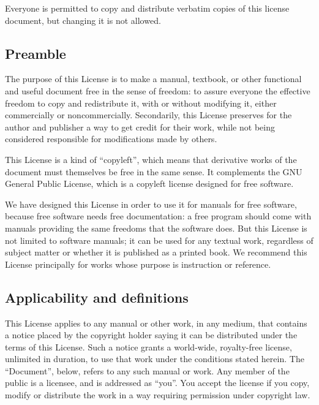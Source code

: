 {\tiny{}Everyone is permitted to copy and distribute verbatim copies
of this license document, but changing it is not allowed.}{\tiny\par}

{\tiny{}\setcounter{subsection}{-1}}{\tiny\par}

\subsection*{{\tiny{}Preamble}}

{\tiny{}The purpose of this License is to make a manual, textbook,
or other functional and useful document free in the sense of freedom:
to assure everyone the effective freedom to copy and redistribute
it, with or without modifying it, either commercially or noncommercially.
Secondarily, this License preserves for the author and publisher a
way to get credit for their work, while not being considered responsible
for modifications made by others.}{\tiny\par}

{\tiny{}This License is a kind of \textquotedblleft copyleft\textsf{''}, which
means that derivative works of the document must themselves be free
in the same sense. It complements the GNU General Public License,
which is a copyleft license designed for free software.}{\tiny\par}

{\tiny{}We have designed this License in order to use it for manuals
for free software, because free software needs free documentation:
a free program should come with manuals providing the same freedoms
that the software does. But this License is not limited to software
manuals; it can be used for any textual work, regardless of subject
matter or whether it is published as a printed book. We recommend
this License principally for works whose purpose is instruction or
reference.}{\tiny\par}

\subsection{Applicability and definitions\label{subsec:1Applicability-and-definitions}}

{\tiny{}This License applies to any manual or other work, in any medium,
that contains a notice placed by the copyright holder saying it can
be distributed under the terms of this License. Such a notice grants
a world-wide, royalty-free license, unlimited in duration, to use
that work under the conditions stated herein. The \textquotedblleft Document\textsf{''},
below, refers to any such manual or work. Any member of the public
is a licensee, and is addressed as \textquotedblleft you\textsf{''}. You accept
the license if you copy, modify or distribute the work in a way requiring
permission under copyright law.}{\tiny\par}

